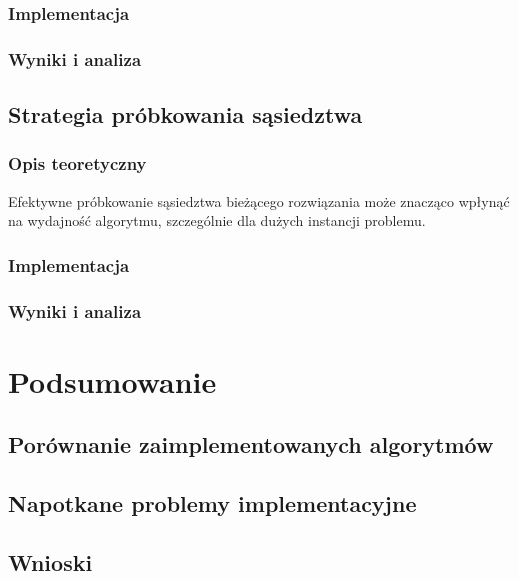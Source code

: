 \documentclass[12pt,a4paper]{article}
\begin{document}
\subsubsection{Implementacja}

\subsubsection{Wyniki i analiza}

\subsection{Strategia próbkowania sąsiedztwa}
\subsubsection{Opis teoretyczny}
Efektywne próbkowanie sąsiedztwa bieżącego rozwiązania może znacząco wpłynąć na wydajność algorytmu, szczególnie dla dużych instancji problemu.

\subsubsection{Implementacja}

\subsubsection{Wyniki i analiza}

\section{Podsumowanie}
\subsection{Porównanie zaimplementowanych algorytmów}

\subsection{Napotkane problemy implementacyjne}

\subsection{Wnioski}
\end{document}
